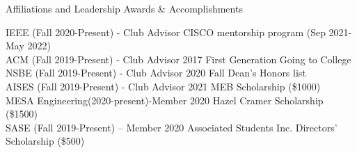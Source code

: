 \documentclass{resume} %
\begin{document}




\begin{rSection}{Affiliations and Leadership Awards \& Accomplishments}

IEEE (Fall 2020-Present) 	 \hfill{- Club Advisor CISCO mentorship program (Sep 2021-May 2022)}\\
ACM (Fall 2019-Present)		 \hfill{- Club Advisor 2017 First Generation Going to College}\\
NSBE (Fall 2019-Present)	 \hfill{- Club Advisor 2020 Fall Dean’s Honors list}\\
AISES (Fall 2019-Present)	 \hfill{- Club Advisor 2021 MEB Scholarship (\$1000)}\\
MESA Engineering(2020-present)\hfill{-Member 2020 Hazel Cramer Scholarship (\$1500)}\\
SASE (Fall 2019-Present) – Member \hfill{ 2020 Associated Students Inc. Directors’ Scholarship (\$500)}\\

\end{rSection}
\end{document}
